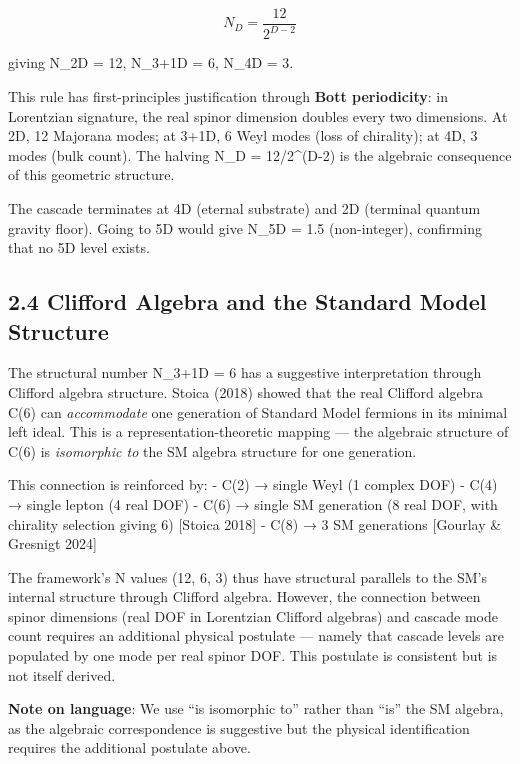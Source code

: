 \[N_D = \frac{12}{2^{D-2}}\]

giving N\_2D = 12, N\_3+1D = 6, N\_4D = 3.

This rule has first-principles justification through \textbf{Bott
periodicity}: in Lorentzian signature, the real spinor dimension doubles
every two dimensions. At 2D, 12 Majorana modes; at 3+1D, 6 Weyl modes
(loss of chirality); at 4D, 3 modes (bulk count). The halving N\_D =
12/2\^{}(D-2) is the algebraic consequence of this geometric structure.

The cascade terminates at 4D (eternal substrate) and 2D (terminal
quantum gravity floor). Going to 5D would give N\_5D = 1.5
(non-integer), confirming that no 5D level exists.

\hypertarget{clifford-algebra-and-the-standard-model-structure}{%
\subsection{2.4 Clifford Algebra and the Standard Model
Structure}\label{clifford-algebra-and-the-standard-model-structure}}

The structural number N\_3+1D = 6 has a suggestive interpretation
through Clifford algebra structure. Stoica (2018) showed that the real
Clifford algebra C(6) can \emph{accommodate} one generation of Standard
Model fermions in its minimal left ideal. This is a
representation-theoretic mapping --- the algebraic structure of C(6) is
\emph{isomorphic to} the SM algebra structure for one generation.

This connection is reinforced by: - C(2) → single Weyl (1 complex DOF) -
C(4) → single lepton (4 real DOF) - C(6) → single SM generation (8 real
DOF, with chirality selection giving 6) {[}Stoica 2018{]} - C(8) → 3 SM
generations {[}Gourlay \& Gresnigt 2024{]}

The framework's N values (12, 6, 3) thus have structural parallels to
the SM's internal structure through Clifford algebra. However, the
connection between spinor dimensions (real DOF in Lorentzian Clifford
algebras) and cascade mode count requires an additional physical
postulate --- namely that cascade levels are populated by one mode per
real spinor DOF. This postulate is consistent but is not itself derived.

\textbf{Note on language}: We use ``is isomorphic to'' rather than
``is'' the SM algebra, as the algebraic correspondence is suggestive but
the physical identification requires the additional postulate above.

